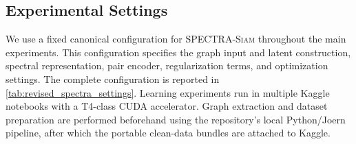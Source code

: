 \documentclass[final,5p,times,twocolumn]{elsarticle}
\newcommand{\method}{\textsc{SPECTRA-Siam}}
\theoremstyle{plain}
\begin{document}
\subsection{Experimental Settings}
\label{sec:revised_settings}

We use a fixed canonical configuration for \method{} throughout the main experiments. This configuration specifies the graph input and latent construction, spectral representation, pair encoder, regularization terms, and optimization settings. The complete configuration is reported in \autoref{tab:revised_spectra_settings}. Learning experiments run in multiple Kaggle notebooks with a T4-class CUDA accelerator. Graph extraction and dataset preparation are performed beforehand using the repository's local Python/Joern pipeline, after which the portable clean-data bundles are attached to Kaggle.
\end{document}
